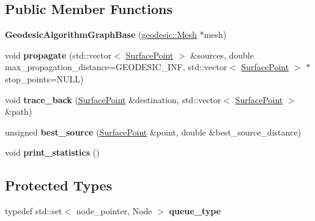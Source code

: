 \subsection*{Public Member Functions}
\begin{DoxyCompactItemize}
\item 
\hypertarget{classgeodesic_1_1_geodesic_algorithm_graph_base_ae492310ecfd6208a727d1680d9751179}{}{\bfseries Geodesic\+Algorithm\+Graph\+Base} (\hyperlink{classgeodesic_1_1_mesh}{geodesic\+::\+Mesh} $\ast$mesh)\label{classgeodesic_1_1_geodesic_algorithm_graph_base_ae492310ecfd6208a727d1680d9751179}

\item 
\hypertarget{classgeodesic_1_1_geodesic_algorithm_graph_base_a626631f58f33d7e53f3e68f5851d7808}{}void {\bfseries propagate} (std\+::vector$<$ \hyperlink{classgeodesic_1_1_surface_point}{Surface\+Point} $>$ \&sources, double max\+\_\+propagation\+\_\+distance=G\+E\+O\+D\+E\+S\+I\+C\+\_\+\+I\+N\+F, std\+::vector$<$ \hyperlink{classgeodesic_1_1_surface_point}{Surface\+Point} $>$ $\ast$stop\+\_\+points=N\+U\+L\+L)\label{classgeodesic_1_1_geodesic_algorithm_graph_base_a626631f58f33d7e53f3e68f5851d7808}

\item 
\hypertarget{classgeodesic_1_1_geodesic_algorithm_graph_base_a8166429fb5f94a4654a8ff3db1712aea}{}void {\bfseries trace\+\_\+back} (\hyperlink{classgeodesic_1_1_surface_point}{Surface\+Point} \&destination, std\+::vector$<$ \hyperlink{classgeodesic_1_1_surface_point}{Surface\+Point} $>$ \&path)\label{classgeodesic_1_1_geodesic_algorithm_graph_base_a8166429fb5f94a4654a8ff3db1712aea}

\item 
\hypertarget{classgeodesic_1_1_geodesic_algorithm_graph_base_aef5dc1c15289e879166f0b8f378772b5}{}unsigned {\bfseries best\+\_\+source} (\hyperlink{classgeodesic_1_1_surface_point}{Surface\+Point} \&point, double \&best\+\_\+source\+\_\+distance)\label{classgeodesic_1_1_geodesic_algorithm_graph_base_aef5dc1c15289e879166f0b8f378772b5}

\item 
\hypertarget{classgeodesic_1_1_geodesic_algorithm_graph_base_a0254b8c4e9ec6bafcf4ab78fb2867a80}{}void {\bfseries print\+\_\+statistics} ()\label{classgeodesic_1_1_geodesic_algorithm_graph_base_a0254b8c4e9ec6bafcf4ab78fb2867a80}

\end{DoxyCompactItemize}
\subsection*{Protected Types}
\begin{DoxyCompactItemize}
\item 
\hypertarget{classgeodesic_1_1_geodesic_algorithm_graph_base_a83b12ebf237e79081ad75397f2b9238d}{}typedef std\+::set$<$ node\+\_\+pointer, Node $>$ {\bfseries queue\+\_\+type}\label{classgeodesic_1_1_geodesic_algorithm_graph_base_a83b12ebf237e79081ad75397f2b9238d}

\end{DoxyCompactItemize}
